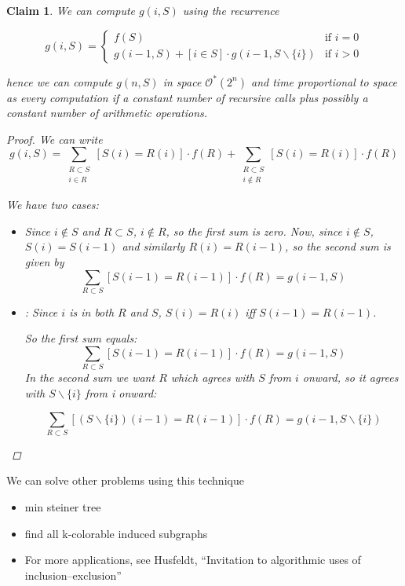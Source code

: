 \documentclass[11pt]{article}
\newtheorem{claim}[theorem]{Claim}
\newcommand{\Oh}{\mathcal{O}}
\newcommand{\Ohstar}{\Oh^\ast}
\begin{document}
\begin{claim}
We can compute $g(i,S)$ using the recurrence

\[
g(i,S) = \begin{cases}
f(S) &\mbox{if } i = 0 \\
g(i-1,S) + [i \in S] \cdot g(i-1,S\backslash \{i\}) &\mbox{if } i > 0
\end{cases}
\]

hence we can compute $g(n,S)$ in space $\Ohstar(2^n)$ and time proportional to space as every computation if a constant number of recursive calls plus possibly a constant number of arithmetic operations.

\begin{proof}
We can write
\[
g(i,S) =
    \sum_{\substack{
        R\subset S \\
        i \in R}}
            [S(i) = R(i)] \cdot f(R)
  + \sum_{\substack{
        R \subset S \\
        i \notin R}}
            [S(i) = R(i)] \cdot f(R)
\]

We have two cases:
\begin{itemize}
\item[$i \notin S$:]
Since $i \notin S$ and $R \subset S$, $i \notin R$, so the first sum is zero. Now, since $i \notin S$, $S(i) = S(i-1)$ and similarly $R(i) = R(i-1)$, so the second sum is given by
\[ \sum_{R \subset S} [ S(i-1) = R(i-1) ] \cdot f(R) = g(i-1,S) \]

\item[$i \in S$]:
Since $i$ is in both $R$ and $S$, $S(i) = R(i)$ iff $S(i-1) = R(i-1)$.

So the first sum equals:
\[ \sum_{R\subset S} [ S(i-1) = R(i-1) ] \cdot f(R) = g(i-1,S) \]
In the second sum we want $R$ which agrees with $S$ from $i$ onward, so it agrees with $S\backslash \{i\}$ from i onward:

\[
\sum_{R \subset S} [(S \backslash \{i \})(i-1) = R(i-1)] \cdot f(R) = g(i-1,S\backslash\{i\})
\]
\end{itemize}

\end{proof}
\end{claim}

We can solve other problems using this technique

\begin{itemize}
\item min steiner tree
\item find all k-colorable induced subgraphs
\item For more applications, see Husfeldt, ``Invitation to algorithmic uses of inclusion–exclusion'' ~\cite{2011arXiv1105.2942H}
\end{itemize}
\end{document}
